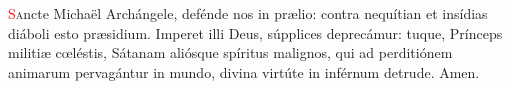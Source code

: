 \lettrine[lines=2]{\textcolor{red}{S}}ancte Michaël Archángele, defénde nos in pr{\ae}lio: contra nequítian et insídias diáboli esto pr{\ae}sidium. Imperet illi Deus, 
súpplices deprecámur: tuque, Prínceps militi{\ae} c{\oe}léstis, Sátanam aliósque spíritus malignos, qui ad perditiónem animarum pervagántur in mundo,
divina virtúte in inférnum detrude. Amen.